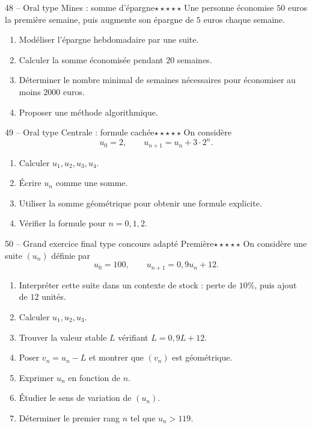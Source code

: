 \documentclass[11pt,a4paper]{article}
\newcommand{\cinqetoiles}{\(\star\star\star\star\star\)}
\begin{document}
\begin{exobox}{48 -- Oral type Mines : somme d'épargne}{\cinqetoiles}
Une personne économise \(50\) euros la première semaine, puis augmente son épargne de \(5\) euros chaque semaine.
\begin{enumerate}[label=\alph*)]
  \item Modéliser l'épargne hebdomadaire par une suite.
  \item Calculer la somme économisée pendant \(20\) semaines.
  \item Déterminer le nombre minimal de semaines nécessaires pour économiser au moins \(2000\) euros.
  \item Proposer une méthode algorithmique.
\end{enumerate}
\end{exobox}

\begin{exobox}{49 -- Oral type Centrale : formule cachée}{\cinqetoiles}
On considère
\[
u_0=2,\qquad u_{n+1}=u_n+3\cdot 2^n.
\]
\begin{enumerate}[label=\alph*)]
  \item Calculer \(u_1,u_2,u_3,u_4\).
  \item Écrire \(u_n\) comme une somme.
  \item Utiliser la somme géométrique pour obtenir une formule explicite.
  \item Vérifier la formule pour \(n=0,1,2\).
\end{enumerate}
\end{exobox}

\begin{exobox}{50 -- Grand exercice final type concours adapté Première}{\cinqetoiles}
On considère une suite \((u_n)\) définie par
\[
u_0=100,\qquad u_{n+1}=0{,}9u_n+12.
\]
\begin{enumerate}[label=\alph*)]
  \item Interpréter cette suite dans un contexte de stock : perte de \(10\%\), puis ajout de \(12\) unités.
  \item Calculer \(u_1,u_2,u_3\).
  \item Trouver la valeur stable \(L\) vérifiant \(L=0{,}9L+12\).
  \item Poser \(v_n=u_n-L\) et montrer que \((v_n)\) est géométrique.
  \item Exprimer \(u_n\) en fonction de \(n\).
  \item Étudier le sens de variation de \((u_n)\).
  \item Déterminer le premier rang \(n\) tel que \(u_n>119\).
\end{enumerate}
\end{exobox}
\end{document}
